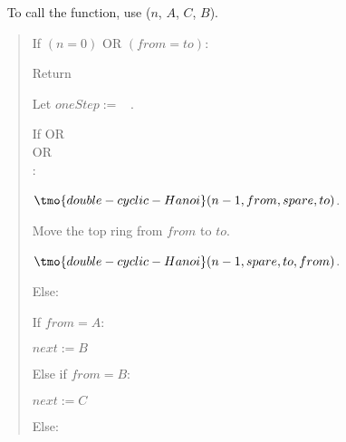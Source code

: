 \documentclass[10pt]{article}
\begin{document}
\begin{solution}\ %
  To call the function, use (\( n \), \( A \), \( C \), \( B \)).
  \begin{quote}
  \noindent{}%

  \begin{steps}
    \item If \( (n = 0) \) OR \( (from = to) \):
      \begin{steps}
        \item Return
      \end{steps}
    \item Let \(oneStep := \) \boolF~.
    \item If \big[(\( from = A \)) AND (\( to = B \))\big] OR \\
      \nf{\quad}\big[(\( from = B \)) AND (\( to = C \))\big] OR \\
      \nf{\quad}\big[(\( from = C \)) AND (\( to = A \))\big]: 
        \begin{steps}
        \item \( \tmo{double-cyclic-Hanoi}(n - 1, from, spare, to) \).
        \item Move the top ring from \( from \) to \( to \).
        \item \( \tmo{double-cyclic-Hanoi}(n - 1, spare, to, from) \).
        \end{steps}
    \setcounter{stepsi}{3}
      \item Else: 
        \begin{steps}
        \item If \(from = A\):
          \begin{steps}
          \item \(next := B\)
          \end{steps}
        \item Else if \(from = B\):
          \begin{steps}
          \item \(next := C\)
          \end{steps}
        \item Else:

\end{steps}
\end{steps}
\end{quote}
\end{solution}
\end{document}
